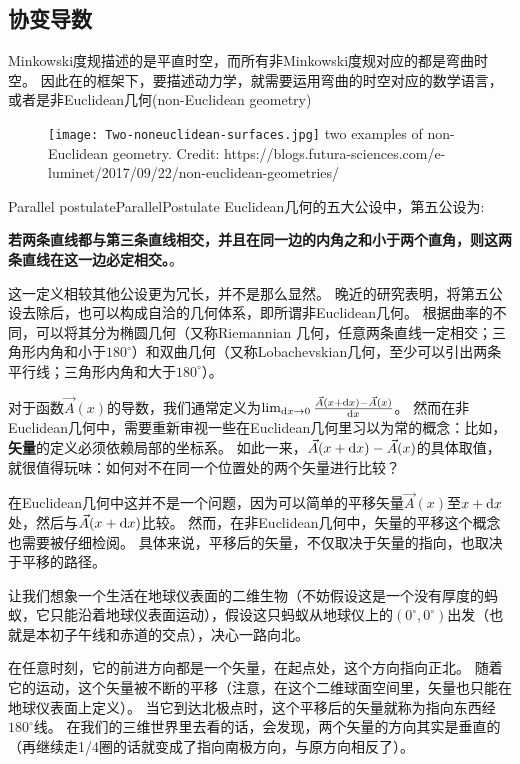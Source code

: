 \subsection{协变导数} 
Minkowski度规描述的是平直时空，而所有非Minkowski度规对应的都是弯曲时空。
因此在\GR 的框架下，要描述动力学，就需要运用弯曲的时空对应的数学语言，或者是非Euclidean几何(non-Euclidean geometry)
\begin{figure}[htp]
\centering
\texttt{[image: Two-noneuclidean-surfaces.jpg]}
  {two examples of non-Euclidean geometry. Credit: https://blogs.futura-sciences.com/e-luminet/2017/09/22/non-euclidean-geometries/}
\label{fig:nonEuclidean}
\end{figure}

\begin{myprop}{Parallel postulate}{ParallelPostulate}
  Euclidean几何的五大公设中，第五公设为:

  {\textbf{若两条直线都与第三条直线相交，并且在同一边的内角之和小于两个直角，则这两条直线在这一边必定相交。}}。

  这一定义相较其他公设更为冗长，并不是那么显然。
  晚近的研究表明，将第五公设去除后，也可以构成自洽的几何体系，即所谓非Euclidean几何。
  根据曲率的不同，可以将其分为椭圆几何（又称Riemannian 几何，任意两条直线一定相交；三角形内角和小于$180^\circ$）和双曲几何（又称Lobachevskian几何，至少可以引出两条平行线；三角形内角和大于$180^\circ$）。
\end{myprop}

对于函数$\vec{A}(x)$的导数，我们通常定义为$\lim_{{\rm d}x \to 0}\frac{\vec{A}(x+{\rm d}x)-\vec{A}(x)}{{\rm d}x}$。
然而在非Euclidean几何中，需要重新审视一些在Euclidean几何里习以为常的概念：比如，{\textbf{矢量}}的定义必须依赖局部的坐标系。
如此一来，$\vec{A}(x+{\rm d}x)-\vec{A}(x)$的具体取值，就很值得玩味：如何对不在同一个位置处的两个矢量进行比较？

在Euclidean几何中这并不是一个问题，因为可以简单的平移矢量$\vec{A}(x)$至$x+{\rm d}x$处，然后与$\vec{A}(x+{\rm d}x)$比较。
然而，在非Euclidean几何中，矢量的平移这个概念也需要被仔细检阅。
具体来说，平移后的矢量，不仅取决于矢量的指向，也取决于平移的路径。

\begin{example}

让我们想象一个生活在地球仪表面的二维生物（不妨假设这是一个没有厚度的蚂蚁，它只能沿着地球仪表面运动），假设这只蚂蚁从地球仪上的$(0^\circ,0^\circ)$出发（也就是本初子午线和赤道的交点），决心一路向北。

在任意时刻，它的前进方向都是一个矢量，在起点处，这个方向指向正北。
随着它的运动，这个矢量被不断的平移（注意，在这个二维球面空间里，矢量也只能在地球仪表面上定义）。
当它到达北极点时，这个平移后的矢量就称为指向东西经$180^\circ$线。
在我们的三维世界里去看的话，会发现，两个矢量的方向其实是垂直的（再继续走1/4圈的话就变成了指向南极方向，与原方向相反了）。
\end{example}

